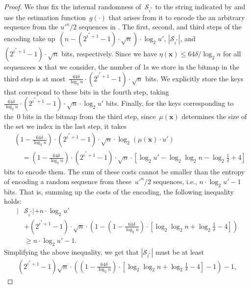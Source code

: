\documentclass[sigconf]{acmart}
\begin{document}
\begin{proof}
    We thus fix the internal randomness of~$\mathcal{S}_{i^*}$ to the string
    indicated by  and use the estimation
    function~$g(\cdot)$ that arises from it to encode the an arbitrary sequence
    from the ${u'}^n/2$ sequences in . The first,
    second, and third steps of the encoding take
    up~$(n-(2^{i^*+1}-1)\cdot\sqrt{n}) \cdot \log_2 u'$, $|\mathcal{S}_{i^*}|$,
    and $(2^{i^*+1}-1)\cdot\sqrt{n}$ bits, respectively. Since we have
    $\eta(\mathbf{x}) \leq 64\delta/\log_2 n$ for all sequencees $\mathbf{x}$
    that we consider, the number of 1s we store in the bitmap in the third step
    is at most~$\frac{64\delta}{\log_2 n} \cdot (2^{i^*+1}-1)\cdot\sqrt{n}$ bits. We
    explicitly store the keys that correspond to these bits in the fourth step,
    taking~$\frac{64\delta}{\log_2 n} \cdot (2^{i^*+1}-1)\cdot\sqrt{n} \cdot
    \log_2 u'$ bits. Finally, for the keys corresponding to the~0 bits in the
    bitmap from the third step, since~$\mu(\mathbf{x})$ determines the size of
    the set we index in the last step, it takes
    { \small
    \begin{align*}
        & \left( 1 - \frac{64\delta}{\log_2 n} \right) \cdot (2^{i^*+1}-1)\cdot\sqrt{n} \cdot \log_2 \left( \mu(\mathbf{x}) \cdot u' \right) \\
        & \;\;\;\; = \left( 1 - \frac{64\delta}{\log_2 n} \right) \cdot (2^{i^*+1}-1)\cdot\sqrt{n} \cdot \left[ \log_2 u' - \log_2\log_2 n - \log_2 \frac{1}{\delta} + 4 \right]
    \end{align*}
    }
    bits to encode them. The sum of these costs cannot be smaller than the
    entropy of encoding a random sequence from these~${u'}^n/2$ sequences,
    i.e., $n \cdot \log_2 u' - 1$ bits. That is, summing up the costs of the
    encoding, the following inequality holds:
    \begin{align*}
        |&\mathcal{S}_{i^*}| + n \cdot \log_2 u' \\ 
        & + (2^{i^*+1}-1) \cdot \sqrt{n} \cdot \left( 1 - \left( 1-\frac{64\delta}{\log_2 n} \right) \cdot \left[ \log_2\log_2 n + \log_2 \frac{1}{\delta} - 4 \right] \right) \\
        & \geq n \cdot \log_2 u' - 1.
    \end{align*}
    Simplifying the above inequality, we get that $|\mathcal{S}_{i^*}|$ must be
    at least
    \begin{align*}
        (2^{i^*+1}-1) \sqrt{n} \cdot \left( \left( 1-\frac{64\delta}{\log_2 n} \right) \cdot \left[ \log_2\log_2 n + \log_2 \frac{1}{\delta} - 4 \right] - 1 \right) - 1,

\end{align*}
\end{proof}
\end{document}
